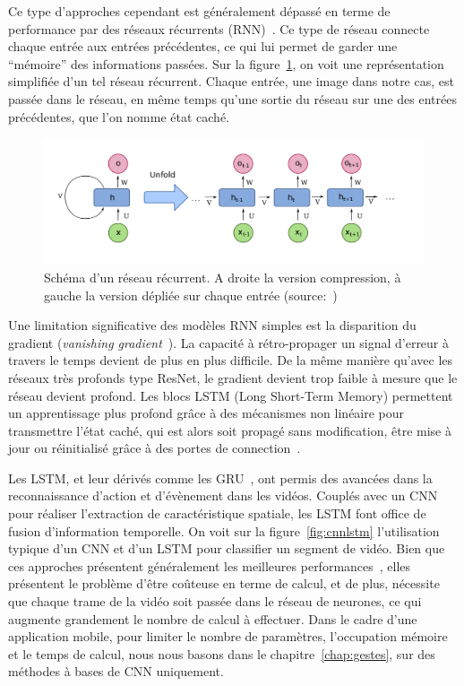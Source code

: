Ce type d'approches cependant est généralement dépassé en terme de performance par des réseaux récurrents (RNN)~\cite{donahue2015long}.
Ce type de réseau connecte chaque entrée aux entrées précédentes, ce qui lui permet de garder une ``mémoire'' des informations passées.
Sur la figure~\ref{fig:rnn}, on voit une représentation simplifiée d'un tel réseau récurrent.
Chaque entrée, une image dans notre cas, est passée dans le réseau, en même temps qu'une sortie du réseau sur une des entrées précédentes, que l'on nomme état caché.

\begin{figure}[ht!]
\centering
\includegraphics[width=\columnwidth]{figures/rnn.png}%
\caption{Schéma d'un réseau récurrent. A droite la version compression, à gauche la version dépliée sur chaque entrée (source:~\cite{lecun2015deep})}%
\label{fig:rnn}%
\end{figure}

Une limitation significative des modèles RNN simples est la disparition du gradient (\textit{vanishing gradient}~\cite{hochreiter1998vanishing}).
La capacité à rétro-propager un signal d'erreur à travers le temps devient de plus en plus difficile.
De la même manière qu'avec les réseaux très profonds type ResNet, le gradient devient trop faible à mesure que le réseau devient profond.
Les blocs LSTM (Long Short-Term Memory) permettent un apprentissage plus profond grâce à des mécanismes non linéaire pour transmettre l'état caché, qui est alors soit propagé sans modification, être mise à jour ou réinitialisé grâce à des portes de connection~\cite{hochreiter1997long}.

Les LSTM, et leur dérivés comme les GRU~\cite{cho2014learning}, ont permis des avancées dans la reconnaissance d'action et d'évènement dans les vidéos.
Couplés avec un CNN pour réaliser l'extraction de caractéristique spatiale, les LSTM font office de fusion d'information temporelle.
On voit sur la figure~\ref{fig:cnnlstm} l'utilisation typique d'un CNN et d'un LSTM pour classifier un segment de vidéo.
Bien que ces approches présentent généralement les meilleures performances~\cite{donahue2015long, yue2015beyond, srivastava2015unsupervised, yao2015video}, elles présentent le problème d'être coûteuse en terme de calcul, et de plus, nécessite que chaque trame de la vidéo soit passée dans le réseau de neurones, ce qui augmente grandement le nombre de calcul à effectuer.
Dans le cadre d'une application mobile, pour limiter le nombre de paramètres, l'occupation mémoire et le temps de calcul, nous nous basons dans le chapitre~\ref{chap:gestes}, sur des méthodes à bases de CNN uniquement.

